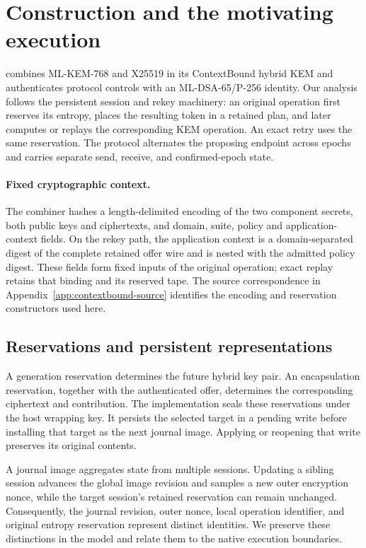 \section{Construction and the motivating execution}
\label{sec:construction}

\qperiapt{} combines ML-KEM-768 and X25519 in its ContextBound hybrid KEM
and authenticates protocol controls with an ML-DSA-65/P-256 identity.
Our analysis follows the persistent session and rekey machinery: an original
operation first reserves its entropy, places the resulting token in a retained
plan, and later computes or replays the corresponding KEM operation. An exact
retry uses the same reservation. The protocol alternates the proposing endpoint
across epochs and carries separate send, receive, and confirmed-epoch state.

\paragraph{Fixed cryptographic context.}
The combiner hashes a length-delimited encoding of the two component secrets,
both public keys and ciphertexts, and domain, suite, policy and
application-context fields. On the rekey path, the application context is a
domain-separated digest of the complete retained offer wire and is nested
with the admitted policy digest. These fields form fixed inputs of the
original operation; exact replay retains that binding and its reserved tape.
The source correspondence in Appendix~\ref{app:contextbound-source} identifies
the encoding and reservation constructors used here.

\subsection{Reservations and persistent representations}

A generation reservation determines the future hybrid key pair. An encapsulation
reservation, together with the authenticated offer, determines the corresponding
ciphertext and contribution. The implementation seals these reservations under
the host wrapping key. It persists the selected target in a pending write before
installing that target as the next journal image. Applying or reopening that
write preserves its original contents.

A journal image aggregates state from multiple sessions. Updating a sibling
session advances the global image revision and samples a new outer encryption
nonce, while the target session's retained reservation can remain unchanged.
Consequently, the journal revision, outer nonce, local operation identifier,
and original entropy reservation represent distinct identities. We preserve
these distinctions in the model and relate them to the native execution boundaries.

